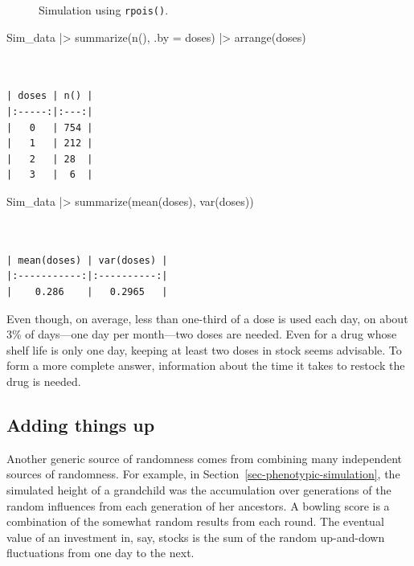 \documentclass[
  letterpaper,
  DIV=11,
  numbers=noendperiod,
  oneside]{scrartcl}
\newenvironment{Shaded}{\begin{snugshade}}{\end{snugshade}}
\newcommand{\AttributeTok}[1]{\textcolor[rgb]{0.40,0.45,0.13}{#1}}
\newcommand{\FunctionTok}[1]{\textcolor[rgb]{0.28,0.35,0.67}{#1}}
\newcommand{\NormalTok}[1]{\textcolor[rgb]{0.00,0.23,0.31}{#1}}
\newcommand{\SpecialCharTok}[1]{\textcolor[rgb]{0.37,0.37,0.37}{#1}}
\begin{document}
\begin{tcolorbox}
\begin{figure}[H]
{}

\caption{\label{fig-pois-sim1}Simulation using \texttt{rpois()}.}

\end{figure}%

\begin{Shaded}
\begin{Highlighting}[]
\NormalTok{Sim\_data }\SpecialCharTok{|\textgreater{}}
  \FunctionTok{summarize}\NormalTok{(}\FunctionTok{n}\NormalTok{(), }\AttributeTok{.by =}\NormalTok{ doses) }\SpecialCharTok{|\textgreater{}} \FunctionTok{arrange}\NormalTok{(doses)}
\end{Highlighting}
\end{Shaded}

\begin{verbatim}


| doses | n() |
|:-----:|:---:|
|   0   | 754 |
|   1   | 212 |
|   2   | 28  |
|   3   |  6  |
\end{verbatim}

\begin{Shaded}
\begin{Highlighting}[]
\NormalTok{Sim\_data }\SpecialCharTok{|\textgreater{}}
  \FunctionTok{summarize}\NormalTok{(}\FunctionTok{mean}\NormalTok{(doses), }\FunctionTok{var}\NormalTok{(doses))}
\end{Highlighting}
\end{Shaded}

\begin{verbatim}


| mean(doses) | var(doses) |
|:-----------:|:----------:|
|    0.286    |   0.2965   |
\end{verbatim}

Even though, on average, less than one-third of a dose is used each day,
on about 3\% of days---one day per month---two doses are needed. Even
for a drug whose shelf life is only one day, keeping at least two doses
in stock seems advisable. To form a more complete answer, information
about the time it takes to restock the drug is needed.

\end{tcolorbox}

\subsection{Adding things up}\label{adding-things-up}

Another generic source of randomness comes from combining many
independent sources of randomness. For example, in
Section~\ref{sec-phenotypic-simulation}, the simulated height of a
grandchild was the accumulation over generations of the random
influences from each generation of her ancestors. A bowling score is a
combination of the somewhat random results from each round. The eventual
value of an investment in, say, stocks is the sum of the random
up-and-down fluctuations from one day to the next.
\end{document}
